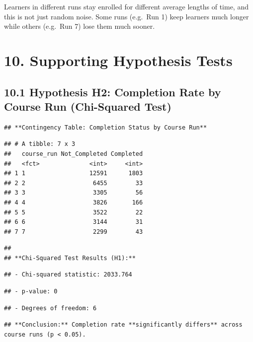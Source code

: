 \documentclass[
]{article}
\begin{document}
Learners in different runs stay enrolled for different average lengths
of time, and this is not just random noise. Some runs (e.g.~Run 1) keep
learners much longer while others (e.g.~Run 7) lose them much sooner.

\section{10. Supporting Hypothesis
Tests}\label{supporting-hypothesis-tests}

\subsection{10.1 Hypothesis H2: Completion Rate by Course Run
(Chi-Squared
Test)}\label{hypothesis-h2-completion-rate-by-course-run-chi-squared-test}

\begin{verbatim}
## **Contingency Table: Completion Status by Course Run**
\end{verbatim}

\begin{verbatim}
## # A tibble: 7 x 3
##   course_run Not_Completed Completed
##   <fct>              <int>     <int>
## 1 1                  12591      1803
## 2 2                   6455        33
## 3 3                   3305        56
## 4 4                   3826       166
## 5 5                   3522        22
## 6 6                   3144        31
## 7 7                   2299        43
\end{verbatim}

\begin{verbatim}
## 
## **Chi-Squared Test Results (H1):**
\end{verbatim}

\begin{verbatim}
## - Chi-squared statistic: 2033.764
\end{verbatim}

\begin{verbatim}
## - p-value: 0
\end{verbatim}

\begin{verbatim}
## - Degrees of freedom: 6
\end{verbatim}

\begin{verbatim}
## **Conclusion:** Completion rate **significantly differs** across course runs (p < 0.05).
\end{verbatim}
\end{document}
